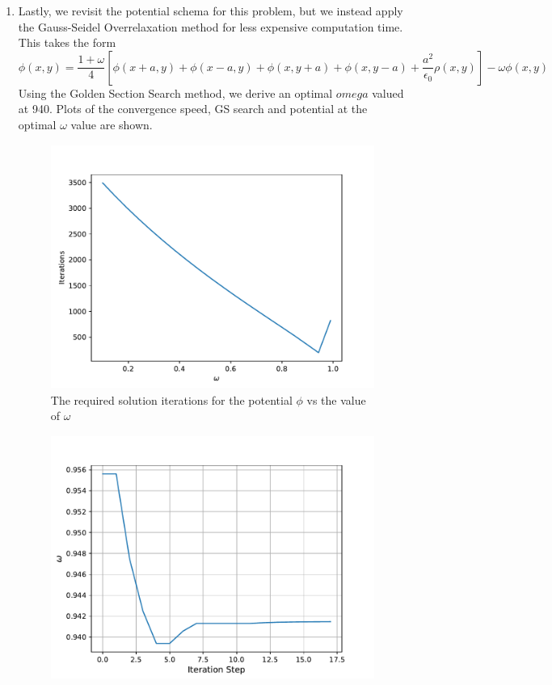 \documentclass{article}
\begin{document}
\begin{enumerate}
{\begin{enumerate}
{\begin{figure}[tp]
            \caption{The potential field of the data set using the relaxation method. }
            \label{fig:my_label}
        \end{figure}}
        \item{Lastly, we revisit the potential schema for this problem, but we instead apply the Gauss-Seidel Overrelaxation method for less expensive computation time. This takes the form
        \begin{equation*}
            \phi(x,y) = \frac{1 + \omega}{4}\left[\phi(x+a,y) + \phi(x-a,y) + \phi(x,y+a) + \phi(x,y-a) + \frac{a^2}{\epsilon_0}\rho(x,y) \right] - \omega\phi(x,y)
        \end{equation*}
        Using the Golden Section Search method, we derive an optimal $omega$ valued at 940. Plots of the convergence speed, GS search and potential at the optimal $\omega$ value are shown.
        \begin{figure}[tp]
            \centering
            \includegraphics[width=\textwidth, height=8cm]{omega_i.pdf}
            \caption{The required solution iterations for the potential $\phi$ vs the value of $\omega$}
            \label{fig:my_label}
        \end{figure}
        \begin{figure}[h!]
            \centering
            \includegraphics[width=\textwidth, height=8cm]{ratio.pdf}

\end{figure}}
\end{enumerate}}
\end{enumerate}
\end{document}
